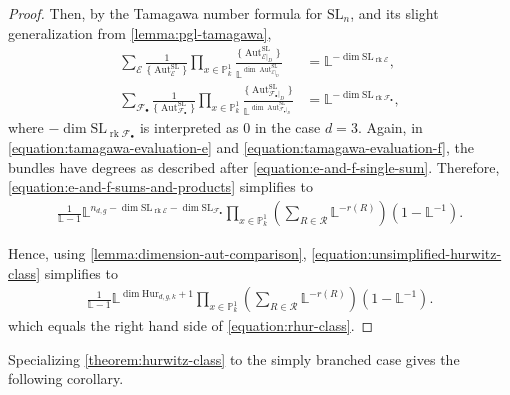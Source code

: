 \documentclass[12 pt]{amsart}
\theoremstyle{plain}
\theoremstyle{definition}
\theoremstyle{remark}
\numberwithin{equation}{section}
\newcommand\bl{\mathbb L}
\newcommand\bp{\mathbb P}
\newcommand\sce{\mathscr E}
\newcommand\scf{\mathscr F}
\newcommand\hur[3]{\mathrm{Hur}_{#1,#2,#3}} %
\newcommand\systemdim[2]{n_{#1,#2}} %
\DeclareMathOperator\rk{rk}
\DeclareMathOperator\aut{Aut}
\renewcommand\sl{\mathrm{SL}}
\begin{document}
\begin{proof}
Then, by the Tamagawa number formula for $\sl_n$, and its slight generalization
from \autoref{lemma:pgl-tamagawa}, \begin{align}
	\label{equation:tamagawa-evaluation-e}
	\sum_{\sce} \frac{1}{\{\aut^{\sl}_{\sce}\}}\prod_{x \in
	\bp^1_k}\frac{\{\aut^{\sl}_{\sce|_D}\}}{\bl^{\dim \aut^{\sl}_{\sce|_D}}}
	&= \bl^{-\dim \sl_{\rk \sce}}, \\ 
	\label{equation:tamagawa-evaluation-f}
	\sum_{\scf_\bullet}
\frac{1}{\{\aut^{\sl}_{\scf_\bullet}\}}\prod_{x \in
\bp^1_k}\frac{\{\aut^{\sl}_{\scf_\bullet|_D}\}}{\bl^{\dim
\aut^{\sl}_{\scf_\bullet|_D}}} &= \bl^{-\dim \sl_{\rk \scf_\bullet}}, \end{align}
where $-\dim \sl_{\rk \scf_\bullet}$ is interpreted as $0$ in the case $d = 3$.
Again, in \eqref{equation:tamagawa-evaluation-e} and \eqref{equation:tamagawa-evaluation-f}, the bundles have degrees as described after
\eqref{equation:e-and-f-single-sum}.
Therefore, \eqref{equation:e-and-f-sums-and-products} simplifies to
\begin{align}
		\label{equation:simplified-hurwitz-class}
		\frac{1}{\bl - 1} \bl^{\systemdim d g - \dim \sl_{\rk \sce} -
			\dim \sl_{\scf_\bullet}} \prod_{x \in \bp^1_k} \left( \sum_{R \in \mathcal
R} \bl^{-r(R)} \right) \left( 1-\bl^{-1} \right).  \end{align} 

Hence, using \autoref{lemma:dimension-aut-comparison},
\eqref{equation:unsimplified-hurwitz-class} simplifies to
	\begin{align} \label{equation:unsimplified-hurwitz-class} \frac{1}{\bl -
		1} \bl^{\dim \hur d g k + 1} \prod_{x \in \bp^1_k} \left(
		\sum_{R \in \mathcal R} \bl^{-r(R)} \right) \left( 1-\bl^{-1}
		\right).  \end{align} which equals the right hand side of
	\eqref{equation:rhur-class}.  \end{proof}

	Specializing \autoref{theorem:hurwitz-class} to the simply branched case
	gives the following corollary.
\end{document}

